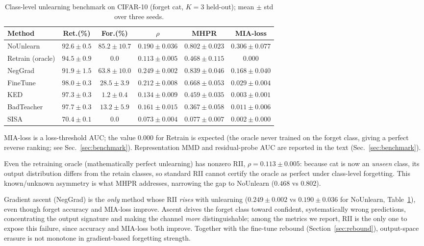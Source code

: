 \documentclass[smallextended]{svjour3}       %
\begin{document}
\begin{table}[t]
\centering
\small
\caption{Class-level unlearning benchmark on CIFAR-10 (forget cat, $K{=}3$ held-out); mean $\pm$ std over three seeds.}\label{tab:benchmark}
\setlength{\tabcolsep}{3pt}
\begin{tabular}{l c c c c c}
\toprule
Method & Ret.(\%) & For.(\%) & $\rho$ & MHPR & MIA-loss \\
\midrule
NoUnlearn & $92.6{\pm}0.5$ & $85.2{\pm}10.7$ & $0.190{\pm}0.036$ & $0.802{\pm}0.023$ & $0.306{\pm}0.077$ \\
Retrain (oracle) & $94.5{\pm}0.9$ & 0.0 & $0.113{\pm}0.005$ & $0.468{\pm}0.115$ & 0.000 \\
NegGrad & $91.9{\pm}1.5$ & $63.8{\pm}10.0$ & $\mathbf{0.249{\pm}0.002}$ & $0.839{\pm}0.046$ & $0.168{\pm}0.040$ \\
FineTune & $98.0{\pm}0.3$ & $28.5{\pm}3.9$ & $0.212{\pm}0.008$ & $0.668{\pm}0.053$ & $0.029{\pm}0.004$ \\
KED & $97.3{\pm}0.3$ & $1.2{\pm}0.4$ & $0.134{\pm}0.009$ & $0.459{\pm}0.035$ & $0.003{\pm}0.001$ \\
BadTeacher & $97.7{\pm}0.3$ & $13.2{\pm}5.9$ & $0.161{\pm}0.015$ & $0.367{\pm}0.058$ & $0.011{\pm}0.006$ \\
SISA & $70.4{\pm}0.1$ & 0.0 & $0.073{\pm}0.004$ & $0.077{\pm}0.007$ & $0.002{\pm}0.000$ \\
\bottomrule
\end{tabular}
\par\vspace{2pt}\footnotesize MIA-loss is a loss-threshold AUC; the value $0.000$ for Retrain is expected (the oracle never trained on the forget class, giving a perfect reverse ranking; see Sec.~\ref{sec:benchmark}). Representation MMD and residual-probe AUC are reported in the text (Sec.~\ref{sec:benchmark}).
\end{table}

Even the retraining oracle (mathematically perfect unlearning) has nonzero RII, $\rho{=}0.113{\pm}0.005$: because cat is now an \emph{unseen} class, its output distribution differs from the retain classes, so standard RII cannot certify the oracle as perfect under class-level forgetting. This known/unknown asymmetry is what MHPR addresses, narrowing the gap to NoUnlearn ($0.468$ vs $0.802$).

Gradient ascent (NegGrad) is the \emph{only} method whose RII \emph{rises} with unlearning ($0.249{\pm}0.002$ vs $0.190{\pm}0.036$ for NoUnlearn, Table~\ref{tab:benchmark}), even though forget accuracy and MIA-loss improve. Ascent drives the forget class toward confident, systematically wrong predictions, concentrating the output signature and making the channel \emph{more} distinguishable; among the metrics we report, RII is the only one to expose this failure, since accuracy and MIA-loss both improve. Together with the fine-tune rebound (Section~\ref{sec:rebound}), output-space erasure is not monotone in gradient-based forgetting strength.
\end{document}
